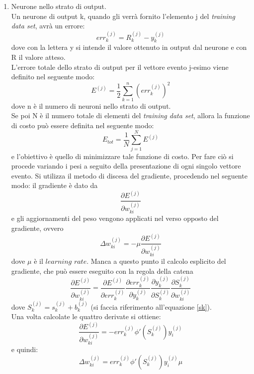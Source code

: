 \begin{enumerate}
	\item Neurone nello strato di output.\\
	Un neurone di output k, quando gli verrà fornito l'elemento j del \textit{training data set}, avrà un errore:
	\begin{equation}
	err_k^{(j)} = R_k^{(j)} - y_k^{(j)}
	\end{equation}
	dove con la lettera y si intende il valore ottenuto in output dal neurone e con R il valore atteso. \\
	L'errore totale dello strato di output per il vettore evento j-esimo viene definito nel seguente modo:
	\begin{equation}
	E^{(j)} = \frac{1}{2} \sum_{k=1}^{n} (err_k^{(j)})^2
	\end{equation}
	dove n è il numero di neuroni nello strato di output. \\
	Se poi N è il numero totale di elementi del \textit{training data set}, allora la funzione di costo può essere definita nel seguente modo:
	\begin{equation}
	E_{tot} = \frac{1}{N}\sum_{j=1}^{N} E^{(j)}
	\end{equation}
	e l'obiettivo è quello di minimizzare tale funzione di costo. Per fare ciò si procede variando i pesi a seguito della presentazione di ogni singolo vettore evento.
	Si utilizza il metodo di discesa del gradiente, procedendo nel seguente modo: il gradiente è dato da
	\begin{equation}
	\frac{\partial E^{(j)} }{\partial w_{ki}^{(j)}}
	\end{equation}
	e gli aggiornamenti del peso vengono applicati nel verso opposto del gradiente, ovvero
	\begin{equation}
	\Delta w_{ki}^{(j)} = -\mu \frac{\partial E^{(j)} }{\partial w_{ki}^{(j)}}
	\end{equation}
	dove $\mu$ è il $\textit{learning rate}$.
	Manca a questo punto il calcolo esplicito del gradiente, che può essere eseguito con la regola della catena 
	\begin{equation}
	\frac{\partial E^{(j)} }{\partial w_{ki}^{(j)}} = \frac{\partial E^{(j)}}{\partial err_k^{(j)}}
	\frac{\partial err_k^{(j)}}{\partial y_k^{(j)}}
	\frac{\partial y_k^{(j)}}{\partial S_k^{(j)}}
	\frac{\partial S_k^{(j)}}{\partial w_{ki}^{(j)}}
	\end{equation}
	dove $S_k^{(j)} = s_k^{(j)} + b_k^{(j)} $ (si faccia riferimento all'equazione \eqref{sk}). \\
	Una volta calcolate le quattro derivate si ottiene:
	\begin{equation}
	\frac{\partial E^{(j)} }{\partial w_{ki}^{(j)}} =
	-err_k^{(j)}\phi'(S_k^{(j)})y_i^{(j)}
	\end{equation}
	e quindi:
	\begin{equation}
	\Delta w_{ki}^{(j)} = err_k^{(j)}\phi'(S_k^{(j)})y_i^{(j)} \mu
	\end{equation}
	

\end{enumerate}
